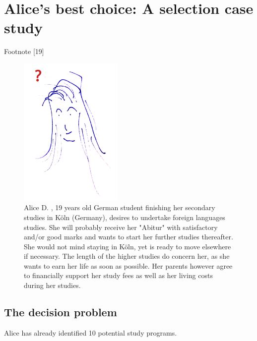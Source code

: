 \chapter{Alice's best choice: A selection case study}
\label{sec:12}



Footnote [19]


\begin{figure}[h]
\sidecaption
\includegraphics[width=5cm]{Figures/AliceF.png}
\caption{Alice D. , 19 years old German student finishing her secondary studies in Köln (Germany), desires to undertake foreign languages studies. She will probably receive her "Abitur" with satisfactory and/or good marks and  wants to start her further studies thereafter. She would not mind staying in Köln, yet is ready to move elsewhere if necessary. The length of the higher studies do concern her, as she wants to earn her life as soon as possible.  Her parents however agree to financially support her study fees as well as her living costs during her studies.}
\label{fig:12.1}       %
\end{figure}

\section{The decision problem}
\label{sec:12.1}

Alice has already identified 10 potential study programs.

